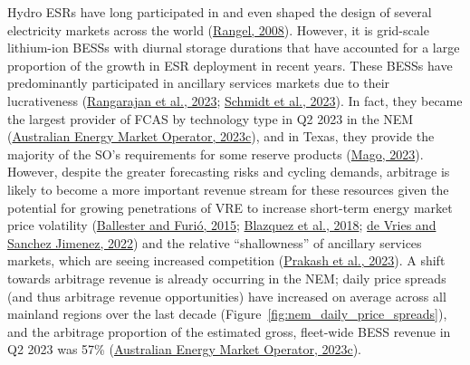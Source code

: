 \documentclass[12pt,a4paper,]{report}
\begin{document}
Hydro ESRs have long participated in and even shaped the design of
several electricity markets across the world
(\protect\hyperlink{ref-rangelCompetitionPolicyRegulation2008}{Rangel,
2008}). However, it is grid-scale lithium-ion BESSs with diurnal storage
durations that have accounted for a large proportion of the growth in
ESR deployment in recent years. These BESSs have predominantly
participated in ancillary services markets due to their lucrativeness
(\protect\hyperlink{ref-rangarajanAssessingImpactBattery2023}{Rangarajan
et al., 2023};
\protect\hyperlink{ref-schmidtMonetizingEnergyStorage2023a}{Schmidt et
al., 2023}). In fact, they became the largest provider of FCAS by
technology type in Q2 2023 in the NEM
(\protect\hyperlink{ref-australianenergymarketoperatorQuarterlyEnergyDynamics2023a}{Australian
Energy Market Operator, 2023c}), and in Texas, they provide the majority
of the SO's requirements for some reserve products
(\protect\hyperlink{ref-magoERCOTOperationalExperience2023}{Mago,
2023}). However, despite the greater forecasting risks and cycling
demands, arbitrage is likely to become a more important revenue stream
for these resources given the potential for growing penetrations of VRE
to increase short-term energy market price volatility
(\protect\hyperlink{ref-ballesterEffectsRenewablesStylized2015}{Ballester
and Furió, 2015};
\protect\hyperlink{ref-blazquezRenewableEnergyPolicy2018}{Blazquez et
al., 2018}; \protect\hyperlink{ref-devriesMarketSignalsAdequacy2022}{de
Vries and Sanchez Jimenez, 2022}) and the relative ``shallowness'' of
ancillary services markets, which are seeing increased competition
(\protect\hyperlink{ref-prakashQuantifyingReserveCapabilities2023}{Prakash
et al., 2023}). A shift towards arbitrage revenue is already occurring
in the NEM; daily price spreads (and thus arbitrage revenue
opportunities) have increased on average across all mainland regions
over the last decade (Figure~\ref{fig:nem_daily_price_spreads}), and the
arbitrage proportion of the estimated gross, fleet-wide BESS revenue in
Q2 2023 was 57\%
(\protect\hyperlink{ref-australianenergymarketoperatorQuarterlyEnergyDynamics2023a}{Australian
Energy Market Operator, 2023c}).
\end{document}
